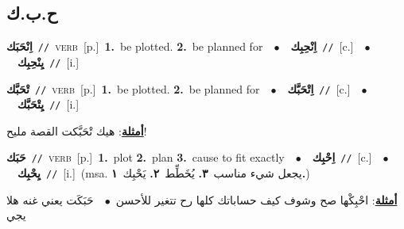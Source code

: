 \documentclass[10pt,a4paper,twoside]{article} %
\begin{document}
\begin{multicols}{2}
\vspace{-3mm}
\subsection*{\color{blue}\foreignlanguage{arabic}{ح.ب.ك}\color{blue}{}} 

{\setlength\topsep{0pt}\textbf{\foreignlanguage{arabic}{اِنْحَبَك}}\ {\color{gray}\texttt{//}\color{black}}\ \textsc{verb}\ [p.]\ \textbf{1.}~be plotted.  \textbf{2.}~be planned for\ \ $\bullet$\ \ \setlength\topsep{0pt}\textbf{\foreignlanguage{arabic}{اِنْحِبِك}}\ {\color{gray}\texttt{//}\color{black}}\ [c.]\ \ $\bullet$\ \ \setlength\topsep{0pt}\textbf{\foreignlanguage{arabic}{يِنْحِبِك}}\ {\color{gray}\texttt{//}\color{black}}\ [i.]\ } \vspace{2mm}

{\setlength\topsep{0pt}\textbf{\foreignlanguage{arabic}{تْحَبَّك}}\ {\color{gray}\texttt{//}\color{black}}\ \textsc{verb}\ [p.]\ \textbf{1.}~be plotted.  \textbf{2.}~be planned for\ \ $\bullet$\ \ \setlength\topsep{0pt}\textbf{\foreignlanguage{arabic}{اِتْحَبَّك}}\ {\color{gray}\texttt{//}\color{black}}\ [c.]\ \ $\bullet$\ \ \setlength\topsep{0pt}\textbf{\foreignlanguage{arabic}{يِتْحَبَّك}}\ {\color{gray}\texttt{//}\color{black}}\ [i.]\  \begin{flushright}\color{gray}\foreignlanguage{arabic}{\textbf{\underline{\foreignlanguage{arabic}{أمثلة}}}: هيك تْحَبَّكت القصة مليح!}\end{flushright}\color{black}} \vspace{2mm}

{\setlength\topsep{0pt}\textbf{\foreignlanguage{arabic}{حَبَك}}\ {\color{gray}\texttt{//}\color{black}}\ \textsc{verb}\ [p.]\ \textbf{1.}~plot  \textbf{2.}~plan  \textbf{3.}~cause to fit exactly\ \ $\bullet$\ \ \setlength\topsep{0pt}\textbf{\foreignlanguage{arabic}{اِحْبِك}}\ {\color{gray}\texttt{//}\color{black}}\ [c.]\ \ $\bullet$\ \ \setlength\topsep{0pt}\textbf{\foreignlanguage{arabic}{يِحْبِك}}\ {\color{gray}\texttt{//}\color{black}}\ [i.]\ \color{gray}(msa. \foreignlanguage{arabic}{يجعل شيء مناسب}~\foreignlanguage{arabic}{\textbf{٣.}}  \foreignlanguage{arabic}{يُخَطِّط}~\foreignlanguage{arabic}{\textbf{٢.}}  \foreignlanguage{arabic}{يَحْبِك}~\foreignlanguage{arabic}{\textbf{١.}})\color{black}\  \begin{flushright}\color{gray}\foreignlanguage{arabic}{\textbf{\underline{\foreignlanguage{arabic}{أمثلة}}}: احْبِكْها صح وشوف كيف حساباتك كلها رح تتغير للأحسن\ $\bullet$\ \  حَبَكَت يعني غنه هلا يجي}\end{flushright}\color{black}} \vspace{2mm}


\end{multicols}
\end{document}
